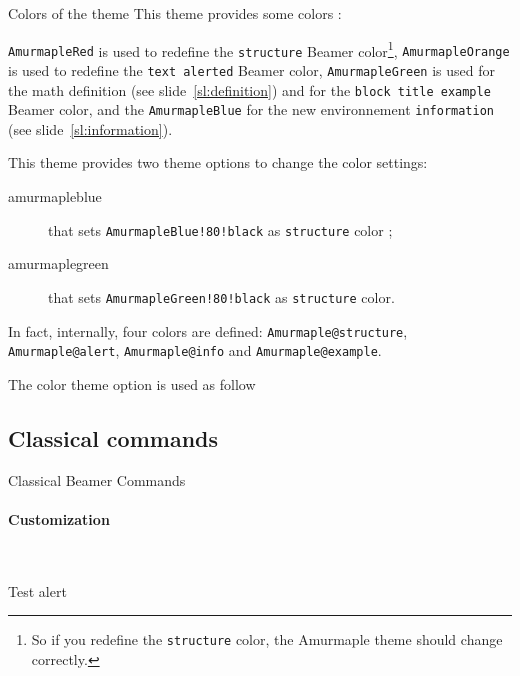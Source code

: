 \documentclass[10pt,aspectratio=169,english]{beamer}
\begin{document}
\begin{frame}{Colors of the theme}
  This theme provides some colors :
  \begin{Code}
\end{Code}

\textcolor{AmurmapleRed}{\lstinline+AmurmapleRed+} is used to redefine the \lstinline+structure+
Beamer color\footnote{So if you redefine the \lstinline+structure+ color, the Amurmaple
theme should change correctly.}, \textcolor{AmurmapleOrange}{\lstinline+AmurmapleOrange+} is used to redefine
the \lstinline+text alerted+ Beamer color, \textcolor{AmurmapleGreen}{\lstinline+AmurmapleGreen+} is
used for the math definition (see slide~\ref{sl:definition}) and for the
\lstinline+block title example+ Beamer color, and the
\textcolor{AmurmapleBlue}{\lstinline+AmurmapleBlue+} for the new environnement
\lstinline+information+ (see slide~\ref{sl:information}).
\framebreak

\label{sl:color}

This theme provides two theme options to change the color settings:
\begin{description}
\item[amurmapleblue] that sets \texttt{AmurmapleBlue!80!black} as \texttt{structure}
  color ;
\item[amurmaplegreen] that sets \texttt{AmurmapleGreen!80!black} as \texttt{structure}
  color.
\end{description}
In fact, internally, four colors are defined: \lstinline+Amurmaple@structure+,
\lstinline+Amurmaple@alert+, \lstinline+Amurmaple@info+ and
\lstinline+Amurmaple@example+.

The color theme option is used as follow
\begin{Code}
\end{Code}
\end{frame}

\subsection{Classical commands}

\begin{frame}[fragile]{Classical Beamer Commands}
  \framesubtitle{Customization}
  \begin{Exemple}
~~
\end{Exemple}
\begin{Exemple}
 \alert{Test alert}
\end{Exemple}
\end{frame}
\end{document}
